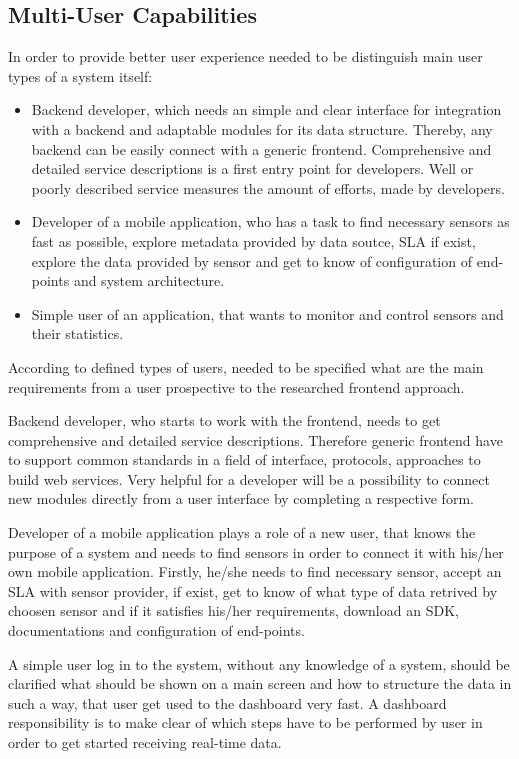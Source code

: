 \subsection {Multi-User Capabilities}
	In order to provide better user experience needed to be distinguish main user types of a system itself:
	\begin{itemize}
	\item Backend developer, which needs an simple and clear interface for integration with a backend and adaptable modules for its data structure. Thereby, any backend can be easily connect with a generic frontend. Comprehensive and detailed service descriptions is a first entry point for developers. Well or poorly described service measures the amount of efforts, made by developers. 
	\item Developer of a mobile application, who has a task to find necessary sensors as fast as possible, explore metadata provided by data soutce, SLA if exist, explore the data provided by sensor and get to know of configuration of end-points and system architecture.
	\item Simple user of an application, that wants to monitor and control sensors and their statistics.
	\end{itemize}
	According to defined types of users, needed to be specified what are the main requirements from a user prospective to the researched frontend approach.

	Backend developer, who starts to work with the frontend, needs to get comprehensive and detailed service descriptions. Therefore generic frontend have to support common standards in a field of interface, protocols, approaches to build web services. Very helpful for a developer will be a possibility to connect new modules directly from a user interface by completing a respective form.

	Developer of a mobile application plays a role of a new user, that knows the purpose of a system and needs to find sensors in order to connect it with his/her own mobile application. Firstly, he/she needs to find necessary sensor, accept an SLA with sensor provider, if exist, get to know of what type of data retrived by choosen sensor and if it satisfies his/her requirements, download an SDK, documentations and configuration of end-points.

	A simple user log in to the system, without any knowledge of a system, should be clarified what should be shown on a main screen and how to structure the data in such a way, that user get used to the dashboard very fast. A dashboard responsibility is to make clear of which steps have to be performed by user in order to get started receiving real-time data.

